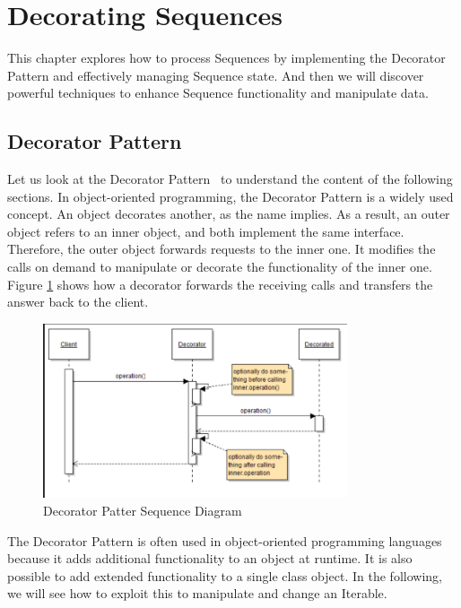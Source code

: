 \section{Decorating Sequences}
\label{sec:Decorating Sequences}
This chapter explores how to process Sequences by implementing the Decorator 
Pattern and effectively managing Sequence state. And then we will discover 
powerful techniques to enhance Sequence functionality and manipulate data.

\subsection{Decorator Pattern}
\label{sub:Decorator Pattern}
Let us look at the Decorator Pattern~\cite[p.~226]{gang_of_four_depa} to understand the content of the 
following sections. In object-oriented programming, the Decorator Pattern is a 
widely used concept. An object decorates another, as the name implies. As a 
result, an outer object refers to an inner object, and both implement the same 
interface. Therefore, the outer object forwards requests to the inner one. It 
modifies the calls on demand to manipulate or decorate the functionality of the 
inner one. Figure \ref{fig:seq_diagramm} shows how a decorator forwards the receiving calls and 
transfers the answer back to the client.

\begin{figure}[H]
    \centering
    \includegraphics[width=0.8\textwidth]{./mainmatter/pictures/decorator_sequence_diagramm.png}
    \caption{Decorator Patter Sequence Diagram}
    \label{fig:seq_diagramm}
\end{figure}

The Decorator Pattern is often used in object-oriented programming languages 
because it adds additional functionality to an object at runtime. It is also 
possible to add extended functionality to a single class object. In the 
following, we will see how to exploit this to manipulate and change an Iterable.


